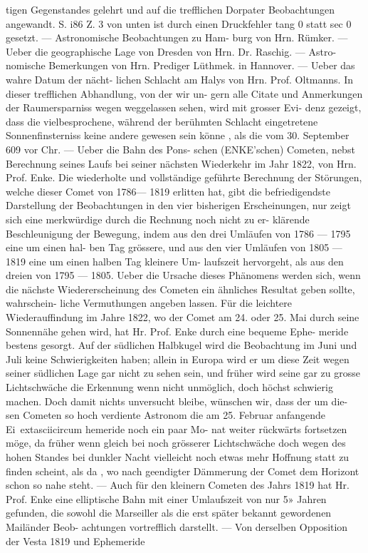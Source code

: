 \documentclass[12pt,a4paper]{article}
\begin{document}
{{{{{{{{tigen  Gegenstandes  gelehrt  und  auf  die  trefflichen  Dorpater  Beobachtungen  angewandt.  S.  i86  Z.  3  von unten  ist  durch  einen  Druckfehler  tang  0  statt  sec  0  gesetzt.  ---  Astronomische  Beobachtungen  zu  Ham- burg von  Hrn.  Rümker.  ---  Ueber  die  geographische  Lage  von  Dresden  von  Hrn.  Dr.  Raschig.  ---  Astro- nomische Bemerkungen  von  Hrn.  Prediger  Lüthmek.  in  Hannover.  ---  Ueber  das  wahre  Datum  der  nächt- lichen Schlacht  am  Halys  von  Hrn.  Prof.  Oltmanns.  In  dieser  trefflichen  Abhandlung,  von  der  wir  un- gern alle  Citate  und  Anmerkungen  der  Raumersparniss  wegen  weggelassen  sehen,  wird  mit  grosser  Evi- denz gezeigt,  dass  die  vielbesprochene,  während  der  berühmten  Schlacht  eingetretene  Sonnenfinsterniss keine  andere  gewesen  sein  könne ,  als  die  vom  30.  September  609  vor  Chr.  ---  Ueber  die  Bahn  des  Pons- schen  (ENKE'schen)  Cometen,  nebst  Berechnung  seines  Laufs  bei  seiner  nächsten  Wiederkehr  im  Jahr  1822, von  Hrn.  Prof.  Enke.  Die  wiederholte  und  vollständige  geführte  Berechnung  der  Störungen,  welche dieser  Comet  von  1786--- 1819  erlitten  hat,  gibt  die  befriedigendste  Darstellung  der  Beobachtungen  in  den vier  bisherigen  Erscheinungen,  nur  zeigt  sich  eine  merkwürdige  durch  die  Rechnung  noch  nicht  zu  er- klärende Beschleunigung  der  Bewegung,  indem  aus  den  drei  Umläufen  von  1786 --- 1795  eine  um  einen  hal- ben Tag  grössere,  und  aus  den  vier  Umläufen  von  1805  --- 1819  eine  um  einen  halben  Tag  kleinere  Um- laufszeit hervorgeht,  als  aus  den  dreien  von  1795  --- 1805.  Ueber  die  Ursache  dieses  Phänomens  werden sich,  wenn  die  nächste  Wiedererscheinung  des  Cometen  ein  ähnliches  Resultat  geben  sollte,  wahrschein- liche Vermuthungen  angeben  lassen.  Für  die  leichtere  Wiederauffindung  im  Jahre  1822,  wo  der  Comet am  24.  oder  25.  Mai  durch  seine  Sonnennähe  gehen  wird,  hat  Hr.  Prof.  Enke  durch  eine  bequeme  Ephe- meride bestens  gesorgt.  Auf  der  südlichen  Halbkugel  wird  die  Beobachtung  im  Juni  und  Juli  keine Schwierigkeiten  haben;  allein  in  Europa  wird  er  um  diese  Zeit  wegen  seiner  südlichen  Lage  gar  nicht zu  sehen  sein,  und  früher  wird  seine  gar  zu  grosse  Lichtschwäche  die  Erkennung  wenn  nicht  unmöglich, doch  höchst  schwierig  machen.  Doch  damit  nichts  unversucht  bleibe,  wünschen  wir,  dass  der  um  die- sen Cometen  so  hoch  verdiente  Astronom  die  am  25.  Februar  anfangende  Ei\	extasciicircum{}{ }hemeride  noch  ein  paar  Mo- nat weiter  rückwärts  fortsetzen  möge,  da  früher  wenn  gleich  bei  noch  grösserer  Lichtschwäche  doch wegen  des  hohen  Standes  bei  dunkler  Nacht  vielleicht  noch  etwas  mehr  Hoffnung  statt  zu  finden  scheint, als  da ,  wo  nach  geendigter  Dämmerung  der  Comet  dem  Horizont  schon  so  nahe  steht.  ---  Auch  für  den kleinern  Cometen  des  Jahrs  1819  hat  Hr.  Prof.  Enke  eine  elliptische  Bahn  mit  einer  Umlaufszeit  von  nur 5»  Jahren  gefunden,  die  sowohl  die  Marseiller  als  die  erst  später  bekannt  gewordenen  Mailänder  Beob- achtungen vortrefflich  darstellt.  ---  Von  derselben  Opposition  der  Vesta  1819  und  Ephemeride  }}}}}}}}
\end{document}
